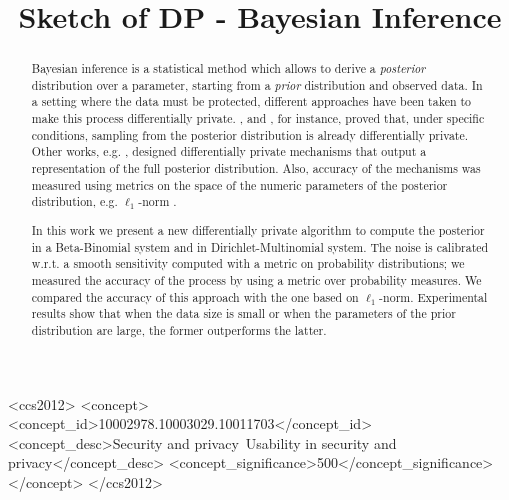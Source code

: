 \documentclass[sigconf, anonymous]{acmart}
\begin{document}
\title{Sketch of DP - Bayesian Inference} %

\begin{abstract}
Bayesian inference is a statistical method which allows to derive a
\emph{posterior} distribution over a parameter, starting from a
\emph{prior} distribution and observed data.  In a setting where the
data must be protected, different approaches have been taken to make
this process differentially private. \citet{dimitrakakis2014robust},
and \citet{wang2015privacy}, for instance, proved that, under specific
conditions, sampling from the posterior distribution is already
differentially private. Other works,
e.g. \cite{zhang2016differential,foulds2016theory}, designed
differentially private mechanisms that output a representation of the
full posterior distribution. Also, accuracy of the mechanisms was
measured using metrics on the space of the numeric parameters of the
posterior distribution, e.g. $\ell_1$-norm .

In this work we present a new differentially private algorithm to
compute the posterior in a Beta-Binomial system and in Dirichlet-Multinomial system.
The noise is calibrated w.r.t. a smooth
sensitivity computed with a metric on probability distributions; we
measured the accuracy of the process by using a metric over
probability measures. We compared the accuracy of this approach with
the one based on $\ell_1$-norm. Experimental results show that when
the data size is small or when the parameters of the prior
distribution are large, the former outperforms the latter.

\end{abstract}


\begin{CCSXML}
<ccs2012>
<concept>
<concept_id>10002978.10003029.10011703</concept_id>
<concept_desc>Security and privacy~Usability in security and privacy</concept_desc>
<concept_significance>500</concept_significance>
</concept>
</ccs2012>
\end{CCSXML}



\maketitle
\end{document}
